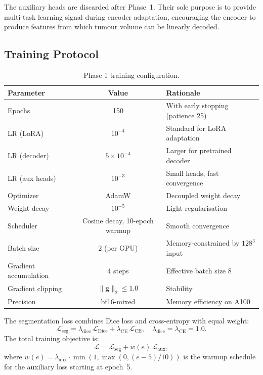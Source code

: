 \begin{remark}
  The auxiliary heads are discarded after Phase~1. Their sole purpose is to
  provide multi-task learning signal during encoder adaptation, encouraging
  the encoder to produce features from which tumour volume can be linearly
  decoded.
\end{remark}

\subsection{Training Protocol}
\label{sec:lora:training}

\begin{table}[H]
  \centering
  \caption{Phase 1 training configuration.}
  \label{tab:lora_training}
  \begin{tabular}{lcp{6cm}}
    \toprule
    \textbf{Parameter} & \textbf{Value} & \textbf{Rationale} \\
    \midrule
    Epochs & 150 & With early stopping (patience 25) \\
    LR (LoRA) & $10^{-4}$ & Standard for LoRA adaptation \\
    LR (decoder) & $5 \times 10^{-4}$ & Larger for pretrained decoder \\
    LR (aux heads) & $10^{-3}$ & Small heads, fast convergence \\
    Optimizer & AdamW & Decoupled weight decay \\
    Weight decay & $10^{-5}$ & Light regularisation \\
    Scheduler & Cosine decay, 10-epoch warmup & Smooth convergence \\
    Batch size & 2 (per GPU) & Memory-constrained by $128^3$ input \\
    Gradient accumulation & 4 steps & Effective batch size 8 \\
    Gradient clipping & $\|\mathbf{g}\|_2 \leq 1.0$ & Stability \\
    Precision & bf16-mixed & Memory efficiency on A100 \\
    \bottomrule
  \end{tabular}
\end{table}

The segmentation loss combines Dice loss and cross-entropy with equal weight:
\begin{equation}
  \mathcal{L}_{\text{seg}} = \lambda_{\text{dice}}\,\mathcal{L}_{\text{Dice}}
    + \lambda_{\text{CE}}\,\mathcal{L}_{\text{CE}},
  \quad \lambda_{\text{dice}} = \lambda_{\text{CE}} = 1.0.
  \label{eq:seg_loss}
\end{equation}
The total training objective is:
\begin{equation}
  \mathcal{L} = \mathcal{L}_{\text{seg}} + w(e)\,\mathcal{L}_{\text{aux}},
  \label{eq:lora_total_loss}
\end{equation}
where $w(e) = \lambda_{\text{aux}} \cdot \min(1, \max(0, (e - 5)/10))$ is
the warmup schedule for the auxiliary loss starting at epoch~5.

